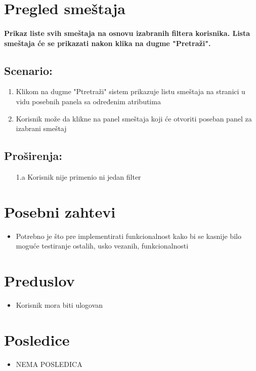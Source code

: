 \section{Pregled smeštaja}
\paragraph{Prikaz liste svih smeštaja na osnovu izabranih filtera korisnika. Lista smeštaja će se prikazati nakon klika na dugme "Pretraži".}

\subsection{\textbf{Scenario:}}
\begin{enumerate}
    \item Klikom na dugme "Ptretraži" sistem prikazuje listu smeštaja na stranici u vidu posebnih panela sa određenim atributima
    \item Korisnik može da klikne na panel smeštaja koji će otvoriti poseban panel za izabrani smeštaj
\end{enumerate}
\newpage
\subsection{\textbf{Proširenja:}}

\begin{enumerate}
\color{Maroon}
  \item[1.a] Korisnik nije primenio ni jedan filter
\end{enumerate}
\section{Posebni zahtevi}
\begin{itemize}
    \item Potrebno je što pre implementirati funkcionalnost kako bi se kasnije bilo moguće testiranje ostalih, usko vezanih, funkcionalnosti
\end{itemize}
\section{Preduslov}
\begin{itemize}
    \item Korisnik mora biti ulogovan
\end{itemize}

\section{Posledice}
\begin{itemize}
    \item \color{Maroon}NEMA POSLEDICA
\end{itemize}
